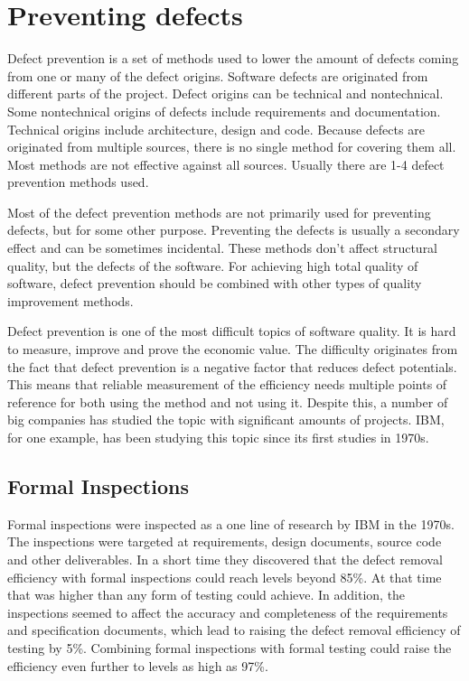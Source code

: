 
 \section{Preventing defects}
\label{sec:preventing}

Defect prevention is a set of methods used to lower the amount of defects coming from one or many of the defect origins. Software defects are originated from different parts of the project. Defect origins can be technical and nontechnical. Some nontechnical origins of defects include requirements and documentation. Technical origins include architecture, design and code. Because defects are originated from multiple sources, there is no single method for covering them all. Most methods are not effective against all sources. Usually there are 1-4 defect prevention methods used.

Most of the defect prevention methods are not primarily used for preventing defects, but for some other purpose. Preventing the defects is usually a secondary effect and can be sometimes incidental. These methods don't affect structural quality, but the defects of the software. For achieving high total quality of software, defect prevention should be combined with other types of quality improvement methods.

Defect prevention is one of the most difficult topics of software quality. It is hard to measure, improve and prove the economic value. The difficulty originates from the fact that defect prevention is a negative factor that reduces defect potentials. This means that reliable measurement of the efficiency needs multiple points of reference for both using the method and not using it. Despite this, a number of big companies has studied the topic with significant amounts of projects. IBM, for one example, has been studying this topic since its first studies in 1970s. 


\subsection{Formal Inspections} 
Formal inspections were inspected as a one line of research by IBM in the 1970s. The inspections were targeted at requirements, design documents, source code and other deliverables. In a short time they discovered that the defect removal efficiency with formal inspections could reach levels beyond 85\%. At that time that was higher than any form of testing could achieve. In addition, the inspections seemed to affect the accuracy and completeness of the requirements and specification documents, which lead to raising the defect removal efficiency of testing by 5\%. Combining formal inspections with formal testing could raise the efficiency even further to levels as high as 97\%. 


